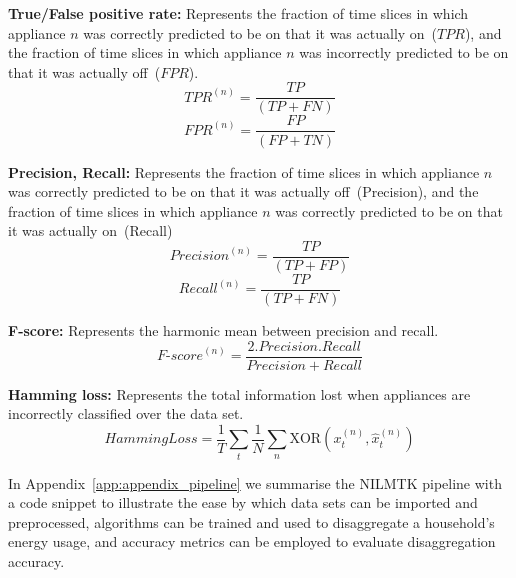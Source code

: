 \documentclass{sig-alternate}
\newcommand{\appref}[1]{Appendix~\ref{#1}}
\begin{document}
\textbf{True/False positive rate:} Represents the fraction of time slices in which appliance $n$ was correctly predicted to be on that it was actually on~($\mathit{TPR}$), and the fraction of time slices in which appliance $n$ was incorrectly predicted to be on that it was actually off~($\mathit{FPR}$).
\begin{equation}
\mathit{TPR}^{(n)} = \frac{\mathit{TP}}{\left ( \mathit{TP} + \mathit{FN} \right )}
\end{equation}
\begin{equation}
\mathit{FPR}^{(n)} = \frac{\mathit{FP}}{\left ( \mathit{FP} + \mathit{TN} \right )}
\end{equation}

\textbf{Precision, Recall:} Represents the fraction of time slices in which appliance $n$ was correctly predicted to be on that it was actually off~(Precision), and the fraction of time slices in which appliance $n$ was correctly predicted to be on that it was actually on~(Recall)
\begin{equation}
\mathit{Precision}^{(n)} = \frac{\mathit{TP}}{\left ( \mathit{TP} + \mathit{FP} \right )}
\end{equation}
\begin{equation}
\mathit{Recall}^{(n)} = \frac{\mathit{TP}}{\left ( \mathit{TP} + \mathit{FN} \right )}
\end{equation}

\textbf{F-score:} Represents the harmonic mean between precision and recall.
\begin{equation}
\mathit{F\text{-}score}^{(n)} = \frac
            {2 . \mathit{Precision} . \mathit{Recall}}
            {\mathit{Precision} + \mathit{Recall}}
\end{equation}

\textbf{Hamming loss:} Represents the total information lost when appliances are incorrectly classified over the data set.
\begin{equation}
\mathit{HammingLoss} = 
        \frac{1}{T} \sum_{t}
        \frac{1}{N} \sum_{n}
        \mathrm{XOR} \left ( x^{(n)}_t, \hat{x}^{(n)}_t \right )
\end{equation}



\noindent
In \appref{app:appendix_pipeline} we summarise the NILMTK pipeline with a code snippet to illustrate the ease by which data sets can be imported and preprocessed, algorithms can be trained and used to disaggregate a household's energy usage, and accuracy metrics can be employed to evaluate disaggregation accuracy.
\end{document}
